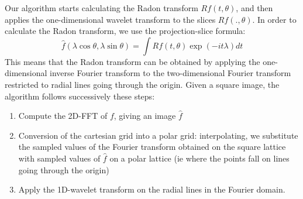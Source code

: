 Our algorithm starts calculating the Radon transform $Rf(t,\theta)$, and then applies the one-dimensional wavelet transform to the slices $Rf(.,\theta)$. 
In order to calculate the Radon transform, we use the projection-slice formula:
$$ \hat f (\lambda\cos\theta, \lambda\sin\theta) =\int Rf(t,\theta) \exp{(-it\lambda)} dt $$
This means that the Radon transform can be obtained by applying the one-dimensional inverse Fourier transform to the two-dimensional Fourier transform restricted to radial lines going through the origin.
Given a square image, the algorithm follows successively these steps:
\begin{enumerate}
\item Compute the 2D-FFT of $f$, giving an image $\hat f$
\item Conversion of the cartesian grid into a polar grid: interpolating, we substitute the sampled values of the Fourier transform obtained on the square lattice with sampled values of $\hat f$ on a polar lattice (ie where the points fall on lines going through the origin)
\item Apply the 1D-wavelet transform on the radial lines in the Fourier domain.
\end{enumerate}

